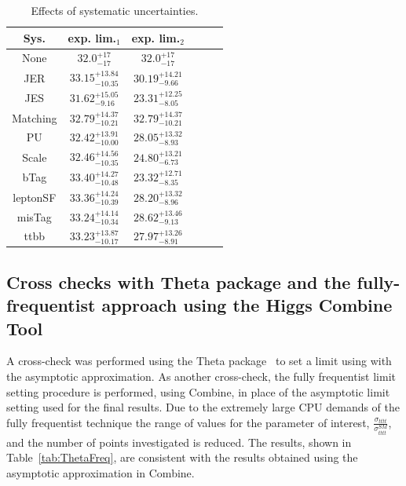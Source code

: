\begin{table}[ht!]
\small
\centering
\begin{tabular}{|c |c |c | c | c | c |}
\hline
 Sys. &  exp. lim.$_{1}$ & exp. lim.$_{2}$   \\
 \hline  
None & $32.0^{+17}_{-17}$ & $32.0^{+17}_{-17}$ \\
 \hline 
 JER &    $33.15^{+13.84}_{-10.35}$  &  $30.19^{+14.21}_{-9.66}$    \\
 \hline  
 JES  & $31.62^{+15.05}_{-9.16}$ &  $23.31^{+12.25}_{-8.05}$     \\
\hline  
Matching &  $32.79^{+14.37}_{-10.21}$ & $32.79^{+14.37}_{-10.21}$     \\  
 \hline  
 PU    &  $32.42^{+13.91}_{-10.00}$  &  $28.05^{+13.32}_{-8.93}$    \\
 \hline  
 Scale  &  $32.46^{+14.56}_{-10.35}$ & $24.80^{+13.21}_{-6.73}$       \\
 \hline  
 bTag &  $33.40^{+14.27}_{-10.48}$ & $23.32^{+12.71}_{-8.35}$       \\
 \hline  
 leptonSF &  $33.36^{+14.24}_{-10.39}$  &  $28.20^{+13.32}_{-8.96}$   \\  
 \hline  
 misTag &  $33.24^{+14.14}_{-10.34}$  &  $28.62^{+13.46}_{-9.13}$  \\
 \hline  
 ttbb  &  $33.23^{+13.87}_{-10.17}$  &  $27.97^{+13.26}_{-8.91}$  \\
 \hline
\end{tabular}
\caption{Effects of systematic uncertainties. }
\label{tab:effectLims}
\end{table}

\subsection{Cross checks with Theta package and the fully-frequentist approach using the Higgs Combine Tool}

A cross-check was performed using the Theta package~\cite{theta} to set a limit using \CLS with the asymptotic approximation. As another cross-check, the fully frequentist \CLS limit setting procedure is performed, using Combine, in place of the asymptotic limit setting used for the final results. Due to the extremely large CPU demands of the fully frequentist technique the range of values for the parameter of interest, $\frac{\sigma_{tttt}}{\sigma_{tttt}^{SM}}$, and the number of points investigated is reduced. The results, shown in Table~\ref{tab:ThetaFreq}, are consistent with the results obtained using the asymptotic approximation in Combine.


